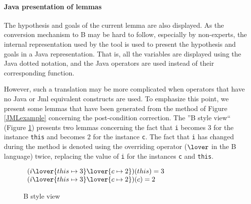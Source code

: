 \paragraph{Java presentation of lemmas}
The hypothesis and goals of the current lemma are also displayed. As
the conversion mechanism to B may be hard to follow, especially by
non-experts, the internal representation used by the tool is used to
present the hypothesis and goals in a Java representation. That is,
all the variables are displayed using the Java dotted notation, and
the Java operators are used instead of their corresponding function.

However, such a translation may be more complicated when operators that
have no Java or Jml equivalent constructs are used.  To emphasize this
point, we present some lemmas that have been generated from the
method of Figure \ref{JMLexample} concerning the post-condition
correction.  The ''B style view`` (Figure \ref{B style view}) presents
two lemmas concerning the fact that \texttt{i} becomes 3 for the
instance \texttt{this} and becomes 2 for the instance \texttt{c}.
 The fact that \texttt{i} has changed during the method is denoted using
the overriding operator ($\lover$ in the B language) twice, replacing the
value of \texttt{i} for the instances \texttt{c} and \texttt{this}.
\begin{figure}[htp]
\begin{center}
$\begin{array}{l}
 (i \lover \{ this \mapsto 3\} \lover \{ c \mapsto 2 \})(this) = 3 \\
 (i \lover \{ this \mapsto 3\} \lover \{ c \mapsto 2 \})(c) = 2
\end{array}$
 \caption{B style view}
 \label{B style view}
\end{center}
\end{figure}


